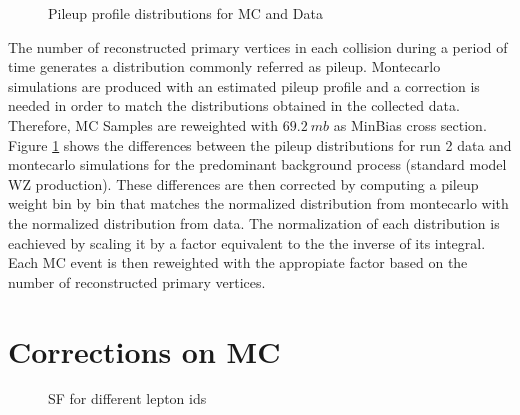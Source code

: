 \begin{figure}[tph]
  \centering
  \caption{Pileup profile distributions for MC and Data}
  \label{fig:RunII_PileupProfiles}
\end{figure}

The number of reconstructed primary vertices in each collision during a period
of time generates a distribution commonly referred as pileup. Montecarlo simulations
are produced with an estimated pileup profile and a correction is needed
in order to match the distributions obtained in the collected data. Therefore,
MC Samples are reweighted with $69.2~mb$ as MinBias cross section.
Figure \ref{fig:RunII_PileupProfiles} shows the differences between the
pileup distributions for run 2 data and montecarlo
simulations for the predominant background process (standard model
WZ production). These differences are then
corrected by computing a pileup weight bin by bin that matches the normalized
distribution from montecarlo with the normalized distribution from data.
The normalization of each distribution is eachieved by scaling it by a factor
equivalent to the the inverse of its integral. Each MC event is then reweighted
with the appropiate factor based on the number of reconstructed primary vertices. 


\section{Corrections on MC}

\begin{figure}[tph]
  \centering
  \caption{SF for different lepton ids}
  \label{fig:leptonidsf}
\end{figure}
